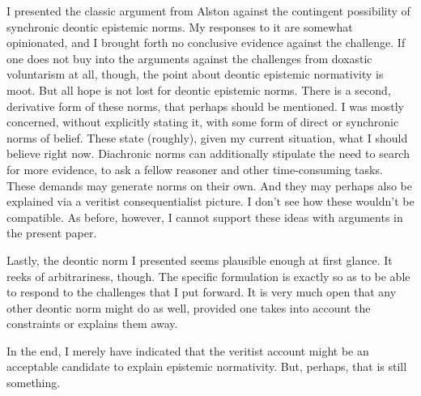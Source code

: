 \documentclass[12pt,numbers=noenddot]{scrartcl}
\begin{document}
I presented the classic argument from Alston against the contingent possibility of synchronic deontic epistemic norms. My responses to it are somewhat opinionated, and I brought forth no conclusive evidence against the challenge. If one does not buy into the arguments against the challenges from doxastic voluntarism at all, though, the point about deontic epistemic normativity is moot. But all hope is not lost for deontic epistemic norms. There is a second, derivative form of these norms, that perhaps should be mentioned. I was mostly concerned, without explicitly stating it, with some form of direct or synchronic norms of belief. These state (roughly), given my current situation, what I should believe right now. Diachronic norms can additionally stipulate the need to search for more evidence, to ask a fellow reasoner and other time-consuming tasks. These demands may generate norms on their own. And they may perhaps also be explained via a veritist consequentialist picture. I don't see how these wouldn't be compatible. As before, however, I cannot support these ideas with arguments in the present paper.

Lastly, the deontic norm I presented seems plausible enough at first glance. It reeks of arbitrariness, though. The specific formulation is exactly so as to be able to respond to the challenges that I put forward. It is very much open that any other deontic norm might do as well, provided one takes into account the constraints or explains them away. 

In the end, I merely have indicated that the veritist account might be an acceptable candidate to explain epistemic normativity. But, perhaps, that is still something.

\clearpage
\printbibliography
\end{document}
